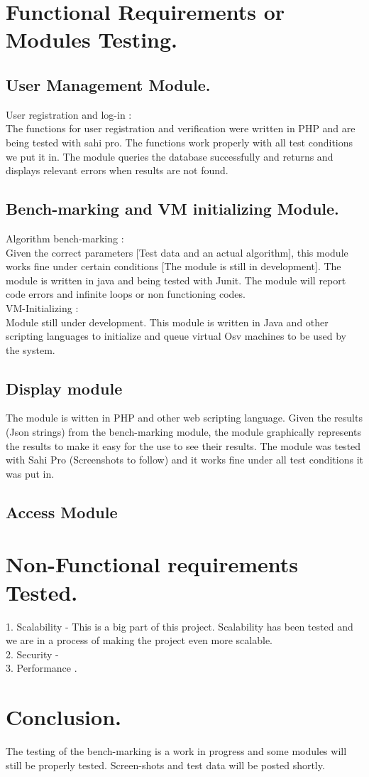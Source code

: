 \documentclass[runningheads,a4paper]{article}
\begin{document}
\section{Functional Requirements or Modules Testing.}
\raggedright{
\subsection{User Management Module.}
User registration and log-in : \\
The functions for user registration and verification were written in PHP and are being tested with sahi pro. The functions work properly with all test conditions we put it in. The module queries the database successfully and returns and displays relevant errors when results are not found.

\subsection{ Bench-marking and VM initializing Module.}
Algorithm bench-marking : \\
Given the correct parameters [Test data and an actual algorithm], this module works fine under certain conditions [The module is still in development].  The module is written in java and being tested with Junit. The module will report code errors and infinite loops or non functioning codes.\\
VM-Initializing : \\
{Module still under development. This module is written in Java and other scripting languages to initialize and queue virtual Osv machines to be used by the system.\\
}
\subsection{Display module}
\raggedright{
The module is witten in PHP and other web scripting language. Given the results (Json strings) from the bench-marking module, the module graphically represents the results to make it easy for the use to see their results. The module was tested with Sahi Pro (Screenshots to follow) and it works fine under all test conditions it was put in.\\
}

\subsection{Access Module}

}
\section{Non-Functional requirements Tested.}
\raggedright{
1. Scalability - This is a big part of this project. Scalability has been tested and we are in a process of making the project even more scalable.
\\2. Security - \\
3. Performance .
}

\section{Conclusion.}
\raggedright{
The testing of the bench-marking is a work in progress and some modules will still be properly tested. Screen-shots and test data will be posted shortly.
}
\end{document}
